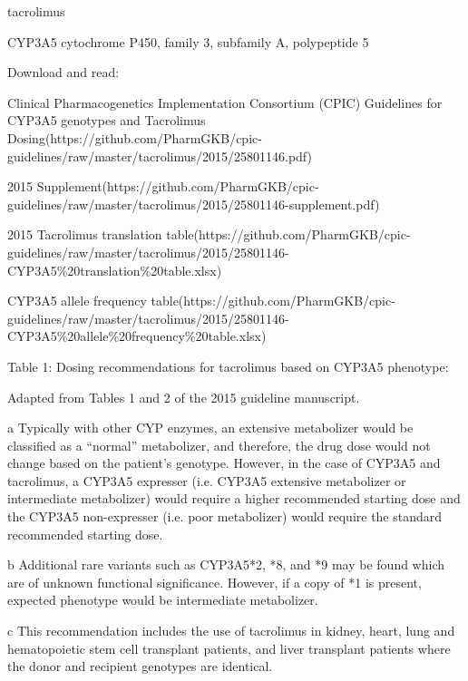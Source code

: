 \documentclass{resume} %
\begin{document}
\begin{rSection}{ tacrolimus }
\begin{rSubsection}{ CYP3A5 }{ cytochrome P450, family 3, subfamily A, polypeptide 5 }{}{}
 \newline
\item Download and read:  
 \newline
\item Clinical Pharmacogenetics Implementation Consortium (CPIC) Guidelines for CYP3A5 genotypes and Tacrolimus Dosing(https://github.com/PharmGKB/cpic-guidelines/raw/master/tacrolimus/2015/25801146.pdf) 
 \newline
\item 2015 Supplement(https://github.com/PharmGKB/cpic-guidelines/raw/master/tacrolimus/2015/25801146-supplement.pdf)
 \newline
\item 2015 Tacrolimus translation table(https://github.com/PharmGKB/cpic-guidelines/raw/master/tacrolimus/2015/25801146-CYP3A5\%20translation\%20table.xlsx)
 \newline
\item CYP3A5 allele frequency table(https://github.com/PharmGKB/cpic-guidelines/raw/master/tacrolimus/2015/25801146-CYP3A5\%20allele\%20frequency\%20table.xlsx)
 \newline
\item Table 1: Dosing recommendations for tacrolimus based on CYP3A5 phenotype:
 \newline
\item Adapted from Tables 1 and 2 of the 2015 guideline manuscript.
 \newline
\item a Typically with other CYP enzymes, an extensive metabolizer would be classified as a “normal” metabolizer, and therefore, the drug dose would not change based on the patient’s genotype. However, in the case of CYP3A5 and tacrolimus, a CYP3A5 expresser (i.e. CYP3A5 extensive metabolizer or intermediate metabolizer) would require a higher recommended starting dose and the CYP3A5 non-expresser (i.e. poor metabolizer) would require the standard recommended starting dose.
 \newline
\item b Additional rare variants such as CYP3A5*2, *8, and *9 may be found which are of unknown functional significance. However, if a copy of *1 is present, expected phenotype would be intermediate metabolizer.
 \newline
\item c This recommendation includes the use of tacrolimus in kidney, heart, lung and hematopoietic stem cell transplant patients, and liver transplant patients where the donor and recipient genotypes are identical.

\end{rSubsection}
\end{rSection}
\end{document}
